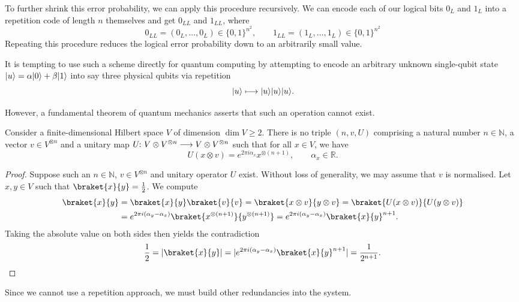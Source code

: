 \documentclass[a4paper, oneside, 12pt]{amsart}
\begin{document}
To further shrink this error probability, we can apply this procedure recursively.
We can encode each of our logical bits \(0_L\) and \(1_L\) into a repetition code of length \(n\) themselves and get \(0_{LL}\) and \(1_{LL}\), where
\begin{equation*}
  0_{LL} = (0_L, \dots, 0_L) \in\{ 0,1\}^{n^{2}}, \qquad
  1_{LL} = (1_L, \dots, 1_L) \in\{ 0,1\}^{n^{2}}
\end{equation*}
Repeating this  procedure reduces the logical error probability down to an arbitrarily small value.
\bigskip

It is tempting to use such a scheme directly for quantum computing  by attempting to encode an arbitrary unknown single-qubit state \(\lvert u\rangle = \alpha\lvert0\rangle + \beta\lvert1\rangle\) into say three physical qubits via repetition
\begin{equation*}
  \lvert u\rangle \longmapsto \lvert u\rangle\lvert u\rangle\lvert u\rangle.
\end{equation*}

However, a fundamental theorem of quantum mechanics asserts that such an operation cannot exist.

\begin{theorem}\label{thm:no-cloning-theorem}
  Consider a finite-dimensional Hilbert space \(V\) of dimension \(\dim V \geq 2\).
  There is no triple \((n,v,U)\) comprising a natural number \(n \in \mathbb{N}\), a vector \(v \in V^{\otimes n}\) and a unitary map \(U \from V\otimes V^{\otimes n} \to V\otimes V^{\otimes n}\) such that for all \(x \in V\), we have
  \begin{equation*}
    U(x \otimes v) = e^{2\pi i \alpha_x} x^{\otimes (n+ 1)},\qquad \alpha_{x} \in \mathbb{R}.
  \end{equation*}
\end{theorem}
\begin{proof}
  Suppose such an \(n\in \mathbb{N}\), \(v \in V^{\otimes n}\) and unitary operator \(U\) exist.
  Without loss of generality, we may assume that \(v\) is normalised.
  Let \(x, y \in V\) such that \(\braket{x}{y} = \frac{1}{2}\).
  We compute
  \begin{align*}
    \braket{x}{y}
    & = \braket{x}{y} \braket{v}{v}
      = \braket{x \otimes v}{y \otimes v}
      = \braket{U(x \otimes v)}{U(y \otimes v)} \\
    & = e^{2 \pi i (\alpha_{y} -\alpha_{x})}\braket{x^{\otimes (n+ 1)}}{y^{\otimes (n+ 1)}}
      = e^{2 \pi i (\alpha_{y} -\alpha_{x})}\braket{x}{y}^{ n+ 1}.
  \end{align*}
  Taking the absolute value on both sides then yields the contradiction
  \begin{equation*}
    \frac{1}{2} = |\braket{x}{y}| = | e^{2 \pi i (\alpha_{y} -\alpha_{x})}\braket{x}{y}^{ n+ 1}| = \frac{1}{2^{n+1}}. \qedhere
  \end{equation*}
\end{proof}
Since we cannot use a repetition approach, we must build other redundancies into the system.
\end{document}

